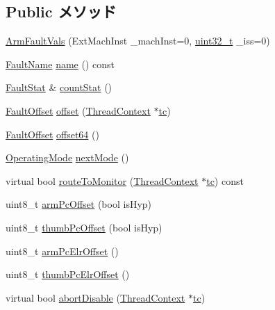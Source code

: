 \subsection*{Public メソッド}
\begin{DoxyCompactItemize}
\item 
\hyperlink{classArmISA_1_1ArmFaultVals_a76dcdcf4411aec99e3180cf1dda1e388}{ArmFaultVals} (ExtMachInst \_\-machInst=0, \hyperlink{Type_8hh_a435d1572bf3f880d55459d9805097f62}{uint32\_\-t} \_\-iss=0)
\item 
\hyperlink{sim_2faults_8hh_abb196df64725e5c2568c900cf130d8d7}{FaultName} \hyperlink{classArmISA_1_1ArmFaultVals_a73adb23259baf912a81683a9790a303f}{name} () const 
\item 
\hyperlink{classStats_1_1Scalar}{FaultStat} \& \hyperlink{classArmISA_1_1ArmFaultVals_a6c79663c761ff57265459f7e3aefaf4c}{countStat} ()
\item 
\hyperlink{classm5_1_1params_1_1Addr}{FaultOffset} \hyperlink{classArmISA_1_1ArmFaultVals_abc6884c0ca3ffb06e3507e320c0d5089}{offset} (\hyperlink{classThreadContext}{ThreadContext} $\ast$\hyperlink{namespaceArmISA_a5aff829af55e65b802d83dfcef4e9dd0}{tc})
\item 
\hyperlink{classm5_1_1params_1_1Addr}{FaultOffset} \hyperlink{classArmISA_1_1ArmFaultVals_a81e30246c00f10182deda977ba385832}{offset64} ()
\item 
\hyperlink{namespaceArmISA_ae306b3353ed3d62bb2e6de130b3c9eaa}{OperatingMode} \hyperlink{classArmISA_1_1ArmFaultVals_a5bddc2d174b417a7f918e873cd12ba2a}{nextMode} ()
\item 
virtual bool \hyperlink{classArmISA_1_1ArmFaultVals_a9a0a467b98f43890c1d89d1d59a5923c}{routeToMonitor} (\hyperlink{classThreadContext}{ThreadContext} $\ast$\hyperlink{namespaceArmISA_a5aff829af55e65b802d83dfcef4e9dd0}{tc}) const 
\item 
uint8\_\-t \hyperlink{classArmISA_1_1ArmFaultVals_a3a08a20ac78186f405db46f8b3373e2f}{armPcOffset} (bool isHyp)
\item 
uint8\_\-t \hyperlink{classArmISA_1_1ArmFaultVals_ad8a859e85912fae683d889d24bedfe08}{thumbPcOffset} (bool isHyp)
\item 
uint8\_\-t \hyperlink{classArmISA_1_1ArmFaultVals_a951709b498aaf37b7361af330f767def}{armPcElrOffset} ()
\item 
uint8\_\-t \hyperlink{classArmISA_1_1ArmFaultVals_a75dbff4cd777bfd8db18b862970689e2}{thumbPcElrOffset} ()
\item 
virtual bool \hyperlink{classArmISA_1_1ArmFaultVals_a1f1a5b662b9a505415dd5ef1f52892f3}{abortDisable} (\hyperlink{classThreadContext}{ThreadContext} $\ast$\hyperlink{namespaceArmISA_a5aff829af55e65b802d83dfcef4e9dd0}{tc})

\end{DoxyCompactItemize}
